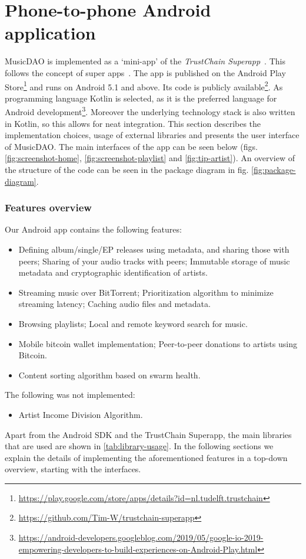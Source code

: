 \section{Phone-to-phone Android application}
MusicDAO is implemented as a `mini-app' of the \textit{TrustChain Superapp}~\citep{mattskala2020}. This follows the concept of super apps~\citep{kpmg2019superapps}. The app is published on the Android Play Store\footnote{\url{https://play.google.com/store/apps/details?id=nl.tudelft.trustchain}} and runs on Android 5.1 and above. Its code is publicly available\footnote{\url{https://github.com/Tim-W/trustchain-superapp}}. As programming language Kotlin is selected, as it is the preferred language for Android development\footnote{\url{https://android-developers.googleblog.com/2019/05/google-io-2019-empowering-developers-to-build-experiences-on-Android-Play.html}}. Moreover the underlying technology stack is also written in Kotlin, so this allows for neat integration. This section describes the implementation choices, usage of external libraries and presents the user interface of MusicDAO. The main interfaces of the app can be seen below (figs. \ref{fig:screenshot-home}, \ref{fig:screenshot-playlist} and \ref{fig:tip-artist}). An overview of the structure of the code can be seen in the package diagram in fig. \ref{fig:package-diagram}.

\subsubsection{\textbf{Features overview}}
Our Android app contains the following features:
\begin{itemize}
    \item Defining album/single/EP releases using metadata, and sharing those with peers; Sharing of your audio tracks with peers; Immutable storage of music metadata and cryptographic identification of artists.
    \item Streaming music over BitTorrent; Prioritization algorithm to minimize streaming latency; Caching audio files and metadata.
    \item Browsing playlists; Local and remote keyword search for music.
    \item Mobile bitcoin wallet implementation; Peer-to-peer donations to artists using Bitcoin.
    \item Content sorting algorithm based on swarm health.
\end{itemize}
The following was not implemented:
\begin{itemize}
    \item Artist Income Division Algorithm.
\end{itemize}
Apart from the Android SDK and the TrustChain Superapp, the main libraries that are used are shown in \ref{tab:library-usage}. In the following sections we explain the details of implementing the aforementioned features in a top-down overview, starting with the interfaces.

